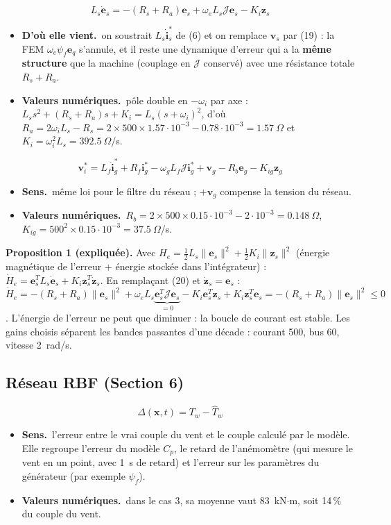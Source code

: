 \documentclass[11pt,a4paper]{article}
\newcommand{\bv}[1]{\mathbf{#1}}
\newcommand{\Jm}{\boldsymbol{\mathcal{J}}}
\newenvironment{expl}{\begin{itemize}[leftmargin=1.2em,itemsep=2pt,topsep=2pt]}{\end{itemize}}
\newcommand{\sens}{\item \textbf{Sens.}~}
\newcommand{\origine}{\item \textbf{D'où elle vient.}~}
\newcommand{\num}{\item \textbf{Valeurs numériques.}~}
\begin{document}
\begin{equation}\tag{20}
L_s\dot{\bv{e}}_s=-(R_s+R_a)\bv{e}_s+\omega_eL_s\Jm\bv{e}_s-K_i\bv{z}_s
\end{equation}
\begin{expl}
\origine on soustrait $L_s\dot{\bv i}_s^*$ de (6) et on remplace $\bv v_s$ par (19) : la FEM
$\omega_e\psi_f\bv e_q$ s'annule, et il reste une dynamique d'erreur qui a la \textbf{même structure} que la
machine (couplage en $\Jm$ conservé) avec une résistance totale $R_s+R_a$.
\num pôle double en $-\omega_i$ par axe : $L_ss^2+(R_s+R_a)s+K_i=L_s(s+\omega_i)^2$, d'où
$R_a=2\omega_iL_s-R_s=2\times500\times1.57\cdot10^{-3}-0.78\cdot10^{-3}=1.57~\Omega$ et
$K_i=\omega_i^2L_s=392.5~\Omega$/s.
\end{expl}

\begin{equation}\tag{21}
\bv{v}_i^* = L_f\dot{\bv{i}}_g^* + R_f\bv{i}_g^* - \omega_gL_f\Jm\bv{i}_g^* + \bv{v}_g
- R_b\bv{e}_g - K_{ig}\bv{z}_g
\end{equation}
\begin{expl}
\sens même loi pour le filtre du réseau ; $+\bv v_g$ compense la tension du réseau.
\num $R_b=2\times500\times0.15\cdot10^{-3}-2\cdot10^{-3}=0.148~\Omega$, $K_{ig}=500^2\times0.15\cdot10^{-3}=37.5~\Omega$/s.
\end{expl}

\textbf{Proposition 1 (expliquée).} Avec $H_e=\frac12L_s\|\bv e_s\|^2+\frac12K_i\|\bv z_s\|^2$ (énergie
\og magnétique\fg{} de l'erreur $+$ énergie stockée dans l'intégrateur) :
$\dot H_e=\bv e_s^TL_s\dot{\bv e}_s+K_i\bv z_s^T\dot{\bv z}_s$. En remplaçant (20) et $\dot{\bv z}_s=\bv e_s$ :
$\dot H_e=-(R_s+R_a)\|\bv e_s\|^2+\omega_eL_s\underbrace{\bv e_s^T\Jm\bv e_s}_{=0}-K_i\bv e_s^T\bv z_s+K_i\bv z_s^T\bv e_s
=-(R_s+R_a)\|\bv e_s\|^2\le0$. L'énergie de l'erreur ne peut que diminuer : la boucle de courant est
stable. Les gains choisis séparent les bandes passantes d'une décade : courant 500, bus 60, vitesse
2~rad/s.

\subsection{Réseau RBF (Section 6)}
\begin{equation}\tag{22}
\Delta(\bv{x},t)=T_w-\hat T_w
\end{equation}
\begin{expl}
\sens l'erreur entre le vrai couple du vent et le couple calculé par le modèle. Elle regroupe l'erreur du
modèle $C_p$, le retard de l'anémomètre (qui mesure le vent en un point, avec 1~s de retard) et l'erreur
sur les paramètres du générateur (par exemple $\psi_f$).
\num dans le cas 3, sa moyenne vaut 83~kN$\cdot$m, soit 14\,\% du couple du vent.
\end{expl}
\end{document}
